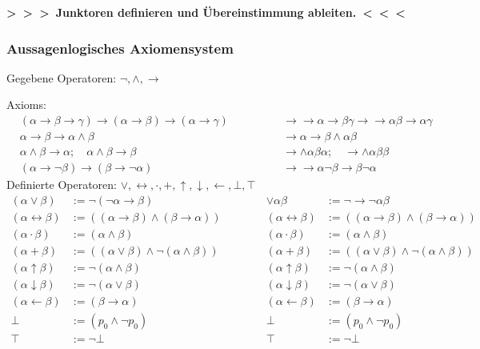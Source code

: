 \documentclass[english,ngerman,parskip=half,headsepline,footsepline,
	fleqn,notitlepage]{scrreprt}
\newcommand*{\defeq}{:=}%
\newcommand*{\ladd}{+}
\newcommand*{\lmult}{\cdot}
\newcommand*{\ltrue}{\top}%
\newcommand*{\lfalse}{\bot}%
\newcommand*{\lrep}{\leftarrow}%
\newcommand*{\limp}{\rightarrow}%
\newcommand*{\lequiv}{\leftrightarrow}%
\newcommand*{\lnand}{\uparrow}%
\newcommand*{\lnor}{\downarrow}%
\newcommand*{\formulatoleft}{&&&&&&&&&&}%
\newcommand*{\formulaspace}{&&&&}%
\newcommand*{\todo}[1]{\textbf{>~>~>~#1~<~<~<}}%
\newcommand*{\subsubsectionname}{Paragraph}
\newcommand*{\glsIdxPl}[1]{\glspl{#1}\idx{\gls{#1}}}%
\begin{document}

\todo{Junktoren definieren und Übereinstimmung ableiten.}%

	\subsubsection{Aussagenlogisches Axiomensystem}%
	\label{subsub:AussagenlogischeAxiome}
	Gegebene Operatoren: $\lnot, \land, \limp$\par
	\glsIdxPl{Axiom}:
	\begin{align}
		&(\alpha\limp\beta\limp\gamma)\limp(\alpha\limp\beta)%
			\limp(\alpha\limp\gamma)
		\formulaspace&&%
		\limp\limp\alpha\limp\beta\gamma\limp\limp\alpha\beta%
			\limp\alpha\gamma\\
		&\alpha\limp\beta\limp\alpha\land\beta
		\formulaspace&&%
		\limp\alpha\limp\beta\land\alpha\beta\\
		&\alpha\land\beta\limp\alpha ;\quad\alpha\land\beta\limp\beta
		\formulaspace&&%
		\limp\land\alpha\beta\alpha ;\quad\limp\land\alpha\beta\beta\\
		&(\alpha\limp\lnot\beta)\limp(\beta\limp\lnot\alpha)
		\formulaspace&&%
		\limp\limp\alpha\lnot\beta\limp\beta\lnot\alpha
		\formulatoleft
	\end{align}
	Definierte Operatoren: $\lor, \lequiv, \lmult, \ladd,
		\lnand, \lnor, \lrep, \lfalse, \ltrue$
	\begin{align}
		(\alpha\lor\beta)&\defeq\lnot(\lnot\alpha\limp\beta)
		\formulaspace&%
		\lor\alpha\beta&\defeq\lnot\limp\lnot\alpha\beta\\
		(\alpha\lequiv\beta)&\defeq
		((\alpha\limp\beta)\land(\beta\limp\alpha))
		\formulaspace&%
		(\alpha\lequiv\beta)&\defeq((\alpha\limp\beta)%
			\land(\beta\limp\alpha))\\
		(\alpha\lmult\beta)&\defeq(\alpha\land\beta)
		\formulaspace&%
		(\alpha\lmult\beta)&\defeq(\alpha\land\beta)\\
		(\alpha\ladd\beta)&\defeq((\alpha\lor\beta)%
			\land\lnot(\alpha\land\beta))
		\formulaspace&%
		(\alpha\ladd\beta)&\defeq((\alpha\lor\beta)%
			\land\lnot(\alpha\land\beta))\\
		(\alpha\lnand\beta)&\defeq\lnot(\alpha\land\beta)
		\formulaspace&%
		(\alpha\lnand\beta)&\defeq\lnot(\alpha\land\beta)\\
		(\alpha\lnor\beta)&\defeq\lnot(\alpha\lor\beta)
		\formulaspace&%
		(\alpha\lnor\beta)&\defeq\lnot(\alpha\lor\beta)\\
		(\alpha\lrep\beta)&\defeq(\beta\limp\alpha)
		\formulaspace&%
		(\alpha\lrep\beta)&\defeq(\beta\limp\alpha)\\
		\lfalse&\defeq(p_0\land\lnot p_0)
		\formulaspace&%
		\lfalse&\defeq(p_0\land\lnot p_0)\\
		\ltrue&\defeq\lnot\lfalse
		\formulaspace&%
		\ltrue&\defeq\lnot\lfalse
		\formulatoleft
	\end{align}
\end{document}
